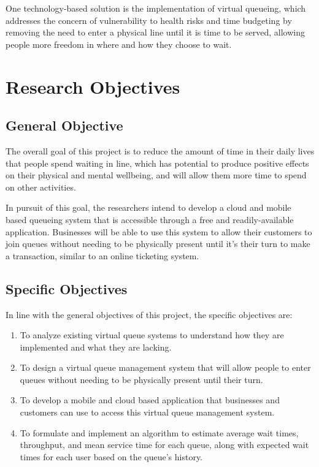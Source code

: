 One technology-based solution is the implementation of virtual queueing, which addresses the concern of vulnerability to health risks and time budgeting by removing the need to enter a physical line until it is time to be served, allowing people more freedom in where and how they choose to wait.


\section{Research Objectives}
\label{sec:researchobjectives}


\subsection{General Objective}
\label{sec:generalobjective}

The overall goal of this project is to reduce the amount of time in their daily lives that people spend waiting in line, which has potential to produce positive effects on their physical and mental wellbeing, and will allow them more time to spend on other activities.

In pursuit of this goal, the researchers intend to develop a cloud and mobile based queueing system that is accessible through a free and readily-available application. Businesses will be able to use this system to allow their customers to join queues without needing to be physically present until it’s their turn to make a transaction, similar to an online ticketing system.


\subsection{Specific Objectives}
\label{sec:specificobjectives}

In line with the general objectives of this project, the specific objectives are:

\begin{enumerate}
	\item To analyze existing virtual queue systems to understand how they are implemented and what they are lacking.
	\item To design a virtual queue management system that will allow people to enter queues without needing to be physically present until their turn.
	\item To develop a mobile and cloud based application that businesses and customers can use to access this virtual queue management system.
	\item To formulate and implement an algorithm to estimate average wait times, throughput, and mean service time for each queue, along with expected wait times for each user based on the queue's history.
\end{enumerate}


